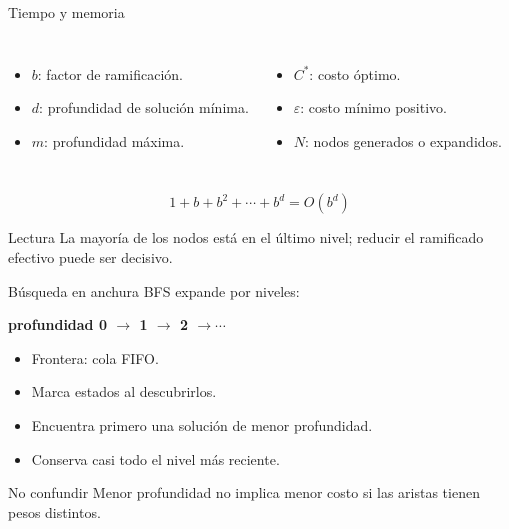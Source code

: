 \documentclass[aspectratio=169,11pt]{beamer}
\newcommand{\concepto}[1]{\textcolor{UAPTeal}{\textbf{#1}}}
\begin{document}
\begin{frame}{Tiempo y memoria}
  \begin{columns}[T]
      \begin{itemize}
        \item $b$: factor de ramificación.
        \item $d$: profundidad de solución mínima.
        \item $m$: profundidad máxima.
      \end{itemize}
      \begin{itemize}
        \item $C^*$: costo óptimo.
        \item $\varepsilon$: costo mínimo positivo.
        \item $N$: nodos generados o expandidos.
      \end{itemize}
  \end{columns}
  \[
    1+b+b^2+\cdots+b^d=O(b^d)
  \]
  \begin{block}{Lectura}
    La mayoría de los nodos está en el último nivel; reducir el ramificado efectivo puede ser decisivo.
  \end{block}
\end{frame}

\begin{frame}{Búsqueda en anchura}
  BFS expande por niveles:
  \begin{center}
    \concepto{profundidad 0 $\rightarrow$ 1 $\rightarrow$ 2 $\rightarrow\cdots$}
  \end{center}
  \begin{itemize}
    \item Frontera: cola FIFO.
    \item Marca estados al descubrirlos.
    \item Encuentra primero una solución de menor profundidad.
    \item Conserva casi todo el nivel más reciente.
  \end{itemize}
  \begin{alertblock}{No confundir}
    Menor profundidad no implica menor costo si las aristas tienen pesos distintos.
  \end{alertblock}
\end{frame}
\end{document}
